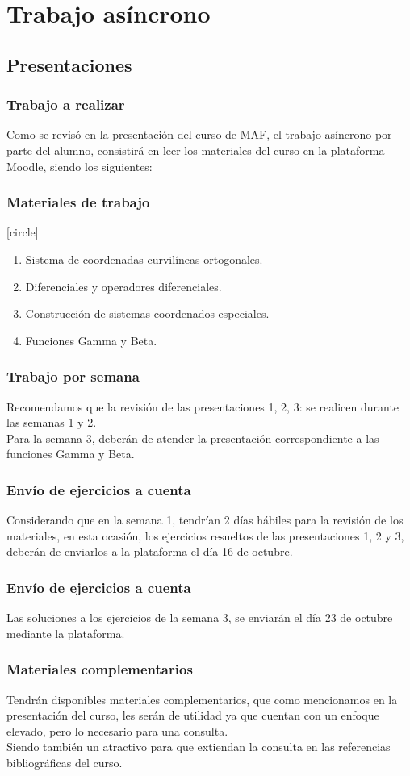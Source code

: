 \documentclass[12pt]{beamer}
\begin{document}
\section{Trabajo asíncrono}
\subsection{Presentaciones}
\begin{frame}
\frametitle{Trabajo a realizar}
Como se revisó en la presentación del curso de MAF, el trabajo asíncrono por parte del alumno, consistirá en leer los materiales del curso en la plataforma Moodle, siendo los siguientes:
\end{frame}
\begin{frame}
\frametitle{Materiales de trabajo}
[circle]
\begin{enumerate}[<+->]
\item Sistema de coordenadas curvilíneas ortogonales.
\item Diferenciales y operadores diferenciales.
\item Construcción de sistemas coordenados especiales.
\item Funciones Gamma y Beta.
\end{enumerate}
\end{frame}
\begin{frame}
\frametitle{Trabajo por semana}
Recomendamos que la revisión de las presentaciones 1, 2, 3: se realicen durante las semanas 1 y 2.
\\
\bigskip
Para la semana 3, deberán de atender la presentación correspondiente a las funciones Gamma y Beta.
\end{frame}
\begin{frame}
\frametitle{Envío de ejercicios a cuenta}
Considerando que en la semana 1, tendrían 2 días hábiles para la revisión de los materiales, en esta ocasión, los ejercicios resueltos de las presentaciones 1, 2 y 3, deberán de enviarlos a la plataforma el día 16 de octubre.
\end{frame}
\begin{frame}
\frametitle{Envío de ejercicios a cuenta}
Las soluciones a los ejercicios de la semana 3, se enviarán el día 23 de octubre mediante la plataforma.
\end{frame}
\begin{frame}
\frametitle{Materiales complementarios}
Tendrán disponibles materiales complementarios, que como mencionamos en la presentación del curso, les serán de utilidad ya que cuentan con un enfoque elevado, pero lo necesario para una consulta.
\\
\bigskip
Siendo también un atractivo para que extiendan la consulta en las referencias bibliográficas del curso.
\end{frame}
\end{document}
